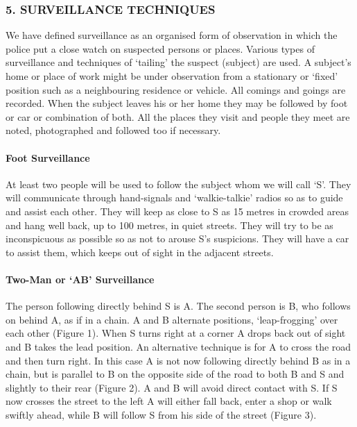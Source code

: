 \subsubsection{5. SURVEILLANCE TECHNIQUES}

We have defined surveillance as an organised form of observation in
which the police put a close watch on suspected persons or places.
Various types of surveillance and techniques of `tailing' the suspect
(subject) are used. A subject's home or place of work might be under
observation from a stationary or `fixed' position such as a neighbouring
residence or vehicle. All comings and goings are recorded. When the
subject leaves his or her home they may be followed by foot or car or
combination of both. All the places they visit and people they meet are
noted, photographed and followed too if necessary.

\paragraph{Foot Surveillance}

At least two people will be used to follow the subject whom we will call
`S'. They will communicate through hand-signals and `walkie-talkie'
radios so as to guide and assist each other. They will keep as close to
S as 15 metres in crowded areas and hang well back, up to 100 metres, in
quiet streets. They will try to be as inconspicuous as possible so as
not to arouse S's suspicions. They will have a car to assist them, which
keeps out of sight in the adjacent streets.

\paragraph{\texorpdfstring{Two-Man or `AB'
Surveillance}{Two-Man or AB Surveillance}}

The person following directly behind S is A. The second person is B, who
follows on behind A, as if in a chain. A and B alternate positions,
`leap-frogging' over each other (Figure 1). When S turns right at a
corner A drops back out of sight and B takes the lead position. An
alternative technique is for A to cross the road and then turn right. In
this case A is not now following directly behind B as in a chain, but is
parallel to B on the opposite side of the road to both B and S and
slightly to their rear (Figure 2). A and B will avoid direct contact
with S. If S now crosses the street to the left A will either fall back,
enter a shop or walk swiftly ahead, while B will follow S from his side
of the street (Figure 3).

